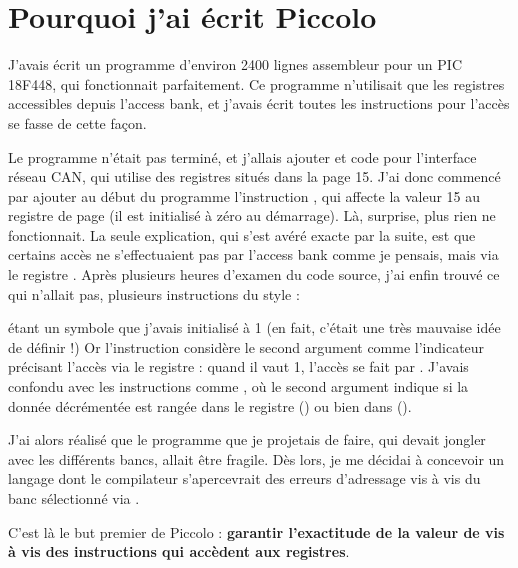 
\cleardoublepage

\chapter{Pourquoi j’ai écrit Piccolo}

\thispagestyle{empty}

J’avais écrit un programme d’environ 2400 lignes assembleur pour un PIC 18F448, qui fonctionnait parfaitement. Ce programme n’utilisait que les registres accessibles depuis l’access bank, et j’avais écrit toutes les instructions pour l’accès se fasse de cette façon.

Le programme n’était pas terminé, et j’allais ajouter et code pour l’interface réseau CAN, qui utilise des registres situés dans la page 15. J’ai donc commencé par ajouter au début du programme l’instruction , qui affecte la valeur 15 au registre de page  (il est initialisé à zéro au démarrage). Là, surprise, plus rien ne fonctionnait. La seule explication, qui s’est avéré exacte par la suite, est que certains accès ne s’effectuaient pas par l’access bank comme je pensais, mais via le registre . Après plusieurs heures d’examen du code source, j’ai enfin trouvé ce qui n’allait pas, plusieurs instructions du style :


 étant un symbole que j’avais initialisé à 1 (en fait, c’était une très mauvaise idée de définir  !) Or l’instruction  considère le second argument comme l’indicateur précisant l’accès via le registre  : quand il vaut 1, l’accès se fait par . J’avais confondu avec les instructions comme , où le second argument indique si la donnée décrémentée est rangée dans le registre () ou bien dans  ().

J’ai alors réalisé que le programme que je projetais de faire, qui devait jongler avec les différents bancs, allait être fragile. Dès lors, je me décidai à concevoir un langage dont le compilateur s’apercevrait des erreurs d’adressage vis à vis du banc sélectionné via .

C’est là le but premier de Piccolo : {\bf garantir l’exactitude de la valeur de  vis à vis des instructions qui accèdent aux registres}.


